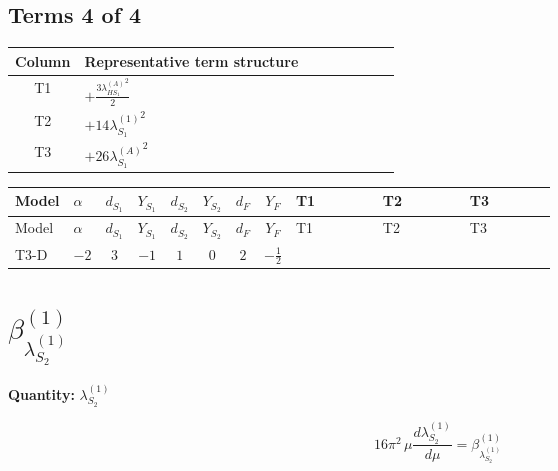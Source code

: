 \documentclass[8pt]{article}
\begin{document}
\begin{landscape}
\subsection*{Terms 4 of 4}
\begin{center}
\begin{tabular}{@{}c >{\raggedright\arraybackslash}p{0.82\linewidth}@{}}
\toprule
Column & Representative term structure \\
\midrule
T1 & \(\displaystyle +\frac{3 {\lambda_{HS_1}^{(A)}}^2}{2}\) \\
\midrule
T2 & \(\displaystyle +14 {\lambda_{S_1}^{(1)}}^2\) \\
\midrule
T3 & \(\displaystyle +26 {\lambda_{S_1}^{(A)}}^2\) \\
\midrule
\bottomrule
\end{tabular}
\end{center}
\smallskip
\tiny
\begin{longtable}{@{}llcccccc >{\raggedright\arraybackslash}p{0.21\linewidth} >{\raggedright\arraybackslash}p{0.21\linewidth} >{\raggedright\arraybackslash}p{0.21\linewidth}@{}}
\toprule
Model & $\alpha$ & $d_{S_1}$ & $Y_{S_1}$ & $d_{S_2}$ & $Y_{S_2}$ & $d_F$ & $Y_F$ & T1 & T2 & T3 \\
\midrule
\endfirsthead
\toprule
Model & $\alpha$ & $d_{S_1}$ & $Y_{S_1}$ & $d_{S_2}$ & $Y_{S_2}$ & $d_F$ & $Y_F$ & T1 & T2 & T3 \\
\midrule
\endhead
T3-D & $-2$ & $3$ & $-1$ & $1$ & $0$ & $2$ & $-\frac{1}{2}$ & \scriptsize\adjustbox{max width=\linewidth}{$\begin{gathered} +\frac{3 {\lambda_{HS_1}^{(A)}}^2}{2}\end{gathered}$} & \scriptsize\adjustbox{max width=\linewidth}{$\begin{gathered} +14 {\lambda_{S_1}^{(1)}}^2\end{gathered}$} & \scriptsize\adjustbox{max width=\linewidth}{$\begin{gathered} +26 {\lambda_{S_1}^{(A)}}^2\end{gathered}$} \\
\midrule
\bottomrule
\end{longtable}
\clearpage
\section*{$\beta_{\lambda_{S_2}^{(1)}}^{(1)}$}
\noindent\textbf{Quantity: }$\lambda_{S_2}^{(1)}$\par\smallskip
\[16\pi^2\,\mu\frac{d \lambda_{S_2}^{(1)}}{d\mu}=\beta_{\lambda_{S_2}^{(1)}}^{(1)}\]

\end{landscape}
\end{document}
